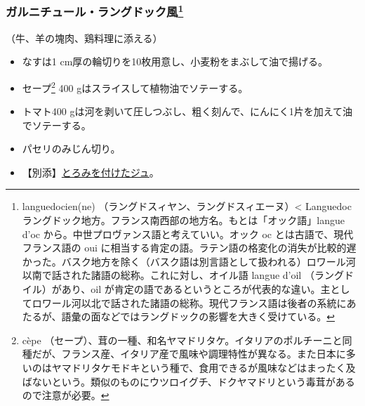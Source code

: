 \begin{recette}
\atoaki{}

\hypertarget{garniture-languedocienne}{%
\subsubsection[ガルニチュール・ラングドック風]{\texorpdfstring{ガルニチュール・ラングドック風\footnote{languedocien(ne)
  （ラングドスィヤン、ラングドスィエーヌ）\textless{} Languedoc
  ラングドック地方。フランス南西部の地方名。もとは「オック語」langue
  d'oc から。中世プロヴァンス語と考えていい。オック oc
  とは古語で、現代フランス語の oui
  に相当する肯定の語。ラテン語の格変化の消失が比較的遅かった。バスク地方を除く（バスク語は別言語として扱われる）ロワール河以南で話された諸語の総称。これに対し、オイル語
  langue d'oil （ラングドイル）があり、oil
  が肯定の語であるというところが代表的な違い。主としてロワール河以北で話された諸語の総称。現代フランス語は後者の系統にあたるが、語彙の面などではラングドックの影響を大きく受けている。}}{ガルニチュール・ラングドック風}}\label{garniture-languedocienne}}



（牛、羊の塊肉、鶏料理に添える）

\begin{itemize}
\item
  なすは1 cm厚の輪切りを10枚用意し、小麦粉をまぶして油で揚げる。
\item
  セープ\footnote{cèpe
    （セープ）、茸の一種、和名ヤマドリタケ。イタリアのポルチーニと同種だが、フランス産、イタリア産で風味や調理特性が異なる。また日本に多いのはヤマドリタケモドキという種で、食用できるが風味などはまったく及ばないという。類似のものにウツロイグチ、ドクヤマドリという毒茸があるので注意が必要。}
  400 gはスライスして植物油でソテーする。
\item
  トマト400
  gは河を剥いて圧しつぶし、粗く刻んで、にんにく1片を加えて油でソテーする。
\item
  パセリのみじん切り。
\item
  【別添】\protect\hyperlink{jus-de-veau-lie}{とろみを付けたジュ}。
\end{itemize}

\atoaki{}

\hypertarget{garniture-lorette}{%
}
\end{recette}
